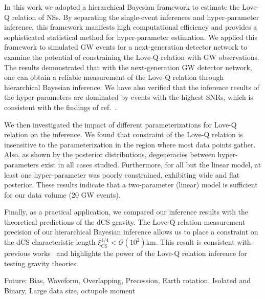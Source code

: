 \documentclass[a4paper,11pt]{article}
\begin{document}
In this work we adopted a hierarchical Bayesian framework to estimate the Love-Q relation of NSs. By separating the single-event inferences and hyper-parameter inference, this framework manifests high computational efficiency and provides a sophisticated statistical method for hyper-parameter estimation. We applied this framework to simulated GW events for a next-generation detector network to examine the potential of constraining the Love-Q relation with GW observations. The results demonstrated that with the next-generation GW detector network, one can obtain a reliable measurement of the Love-Q relation through hierarchical Bayesian inference. We have also verified that the inference results of the hyper-parameters are dominated by events with the highest SNRs, which is consistent with the findings of ref.~\cite{Lackey:2014fwa}.

We then investigated the impact of different parameterizations for Love-Q relation on the inference. We found that constraint of the Love-Q relation is insensitive to the parameterization in the region where most data points gather.
Also, as shown by the posterior distributions, degeneracies between hyper-parameters exist in all cases studied. Furthermore, for all but the linear model, at least one hyper-parameter was poorly constrained, exhibiting wide and flat posterior. These results indicate that a two-parameter (linear) model is sufficient for our data volume (20 GW events).

Finally, as a practical application, we compared our inference results with the theoretical predictions of the dCS gravity. The Love-Q relation measurement precision of our hierarchical Bayesian inference allows us to place a constraint on the dCS characteristic length $\xi_{\mathrm{CS}}^{1/4} < \mathcal{O}(10^2)$km. This result is consistent with previous works~\cite{Yagi:2013bca, Yagi:2013awa} and highlights the power of the Love-Q relation inference for testing gravity theories.

Future: Bias, Waveform, Overlapping, Precession, Earth rotation, Isolated and Binary, Large data size, octupole moment 

\acknowledgments

\clearpage


% 

\end{document}
